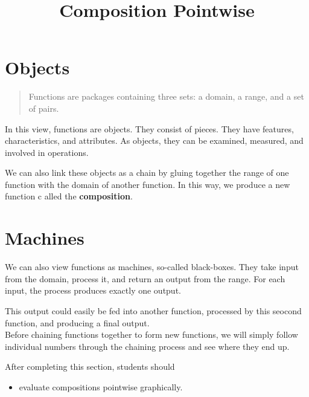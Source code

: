 \documentclass{ximera}
\title{Composition Pointwise}
\begin{document}
\begin{abstract}
\end{abstract}
\maketitle



\section{Objects}


\begin{quote}
Functions are packages containing three sets: a domain, a range, and a set of pairs.
\end{quote}

In this view, functions are objects.  They consist of pieces. They have features, characteristics, and attributes.  As objects, they can be examined, measured, and involved in operations.


We can also link these objects as a chain by gluing together the range of one function with the domain of another function.  In this way, we produce a new function c alled the \textbf{composition}.












\section{Machines}



We can also view functions as machines, so-called black-boxes.  They take input from the domain, process it, and return an output from the range.  For each input, the process produces exactly one output.



This output could easily be fed into another function, processed by this seocond function, and producing a final output. \\



Before chaining functions together to form new functions, we will simply follow individual numbers through the chaining process and see where they end up.


















\begin{sectionOutcomes}
After completing this section, students should 

\begin{itemize}
\item evaluate compositions pointwise graphically.

\end{itemize}
\end{sectionOutcomes}
\end{document}
